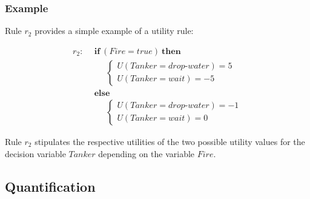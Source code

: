 \subsubsection*{Example}

Rule $r_2$ provides a simple example of a utility rule:

\begin{align*}
r_2: \ \ & \textbf{if} \ (\mathit{Fire}\!=\!\mathit{true}) \ \textbf{then} \\
& \;\;\;\;\;  \begin{cases}
U(\mathit{Tanker}\!=\!\mathit{drop\mbox{-}water}) = 5 \\
U(\mathit{Tanker}\!=\!\mathit{wait}) = -5
\end{cases} \\
& \textbf{else} \\
& \;\;\;\;\; \begin{cases}
U (\mathit{Tanker}\!=\!\mathit{drop\mbox{-}water}) = -1 \\
U(\mathit{Tanker}\!=\!\mathit{wait}) = 0
\end{cases}
\end{align*}

Rule $r_2$ stipulates the respective utilities of the two possible utility values for the decision variable $\mathit{Tanker}$ depending on the variable $\mathit{Fire}$. 

\subsection{Quantification}
\label{sec:quantification}

